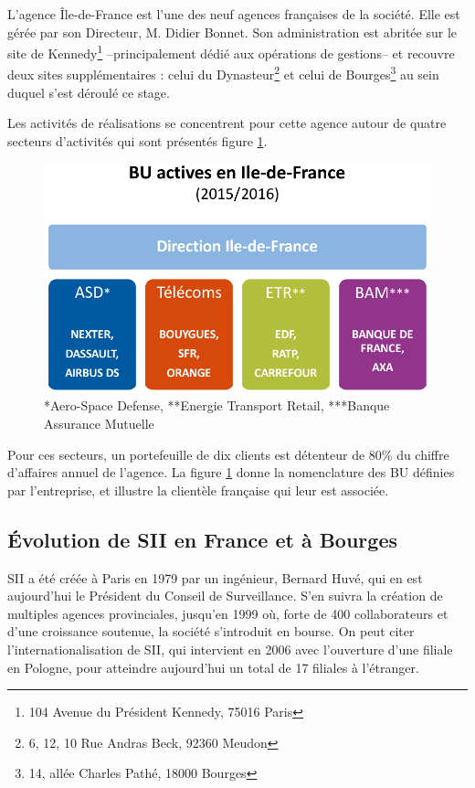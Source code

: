 L'agence Île-de-France est l'une des neuf agences françaises de la société. Elle est gérée par son Directeur, M. Didier Bonnet.
Son administration est abritée sur le site de Kennedy\footnote{104 Avenue du Président Kennedy, 75016 Paris} --principalement dédié aux opérations de gestions-- et recouvre deux sites supplémentaires : celui du 
Dynasteur\footnote{6, 12, 10 Rue Andras Beck, 92360 Meudon} et celui de Bourges\footnote{14, allée Charles Pathé, 18000 Bourges } au sein duquel s'est déroulé ce stage. 

Les activités de réalisations se concentrent pour cette agence autour de quatre secteurs d'activités qui sont présentés figure \ref{fig:BU-IDF}. 

\begin{figure}[h]
  \centering
    \includegraphics[width=.5\linewidth]{figures/BU-clients-IDF}
    \caption*{*Aero-Space Defense, **Energie Transport Retail, ***Banque Assurance Mutuelle}  
  \label{fig:BU-IDF}
\end{figure}

Pour ces secteurs, un portefeuille de dix clients est détenteur de 80\% du chiffre d'affaires annuel de l'agence. 
La figure \ref{fig:BU-IDF} donne la nomenclature des \gls{BU} définies par l'entreprise, et illustre la clientèle française qui leur est associée.  

\subsection{\'{E}volution de SII en France et à Bourges}

SII a été créée à Paris en 1979 par un ingénieur, Bernard Huvé, qui en est aujourd'hui le Président du Conseil de Surveillance. 
S'en suivra la création de multiples agences provinciales, jusqu'en 1999 où, forte de 400 collaborateurs et d'une croissance soutenue, la société s'introduit en bourse.  
On peut citer l'internationalisation de SII, qui intervient en 2006 avec l'ouverture d'une filiale en Pologne, pour atteindre aujourd'hui un total de 17 filiales à l'étranger\cite{Bib_exercice_2015_2016}.  

